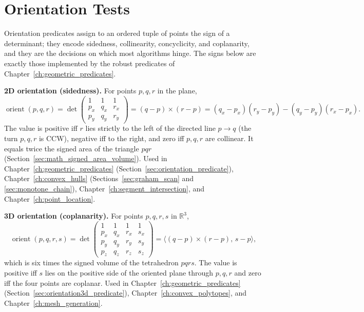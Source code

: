 
\section{Orientation Tests}
\label{sec:app_formulas_orientation}

Orientation predicates assign to an ordered tuple of points the sign of a
determinant; they encode sidedness, collinearity, concyclicity, and
coplanarity, and they are the decisions on which most algorithms hinge.
The signs below are exactly those implemented by the robust predicates of
Chapter~\ref{ch:geometric_predicates}.

\medskip\noindent\textbf{2D orientation (sidedness).}
For points $p, q, r$ in the plane,
\[
  \operatorname{orient}(p,q,r) =
  \det\begin{pmatrix}
    1 & 1 & 1\\ p_x & q_x & r_x\\ p_y & q_y & r_y
  \end{pmatrix}
  = (q-p)\times(r-p)
  = (q_x-p_x)(r_y-p_y) - (q_y-p_y)(r_x-p_x).
\]
The value is positive iff $r$ lies strictly to the left of the directed
line $p\to q$ (the turn $p, q, r$ is CCW), negative iff to the right, and
zero iff $p, q, r$ are collinear. It equals twice the signed area of the
triangle $pqr$ (Section~\ref{sec:math_signed_area_volume}). Used in
Chapter~\ref{ch:geometric_predicates} (Section~\ref{sec:orientation_predicate}),
Chapter~\ref{ch:convex_hulls} (Sections~\ref{sec:graham_scan} and
\ref{sec:monotone_chain}), Chapter~\ref{ch:segment_intersection}, and
Chapter~\ref{ch:point_location}.

\medskip\noindent\textbf{3D orientation (coplanarity).}
For points $p, q, r, s$ in $\mathbb{R}^3$,
\[
  \operatorname{orient}(p,q,r,s) =
  \det\begin{pmatrix}
    1 & 1 & 1 & 1\\
    p_x & q_x & r_x & s_x\\
    p_y & q_y & r_y & s_y\\
    p_z & q_z & r_z & s_z
  \end{pmatrix}
  = \bigl\langle (q-p)\times(r-p),\, s-p\bigr\rangle,
\]
which is six times the signed volume of the tetrahedron $pqrs$. The value
is positive iff $s$ lies on the positive side of the oriented plane through
$p, q, r$ and zero iff the four points are coplanar. Used in
Chapter~\ref{ch:geometric_predicates} (Section~\ref{sec:orientation3d_predicate}),
Chapter~\ref{ch:convex_polytopes}, and Chapter~\ref{ch:mesh_generation}.

